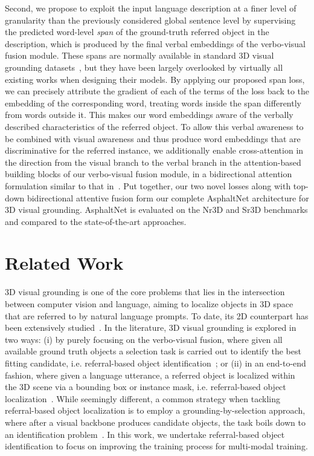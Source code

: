 \documentclass[10pt,twocolumn,letterpaper]{article}
\begin{document}
Second, we propose to exploit the input language description at a finer level of granularity than the previously considered global sentence level by supervising the predicted word-level \emph{span} of the ground-truth referred object in the description, which is produced by the final verbal embeddings of the verbo-visual fusion module. These spans are normally available in standard 3D visual grounding datasets~\cite{achlioptas2020referit_3d}, but they have been largely overlooked by virtually all existing works when designing their models. By applying our proposed span loss, we can precisely attribute the gradient of each of the terms of the loss back to the embedding of the corresponding word, treating words inside the span differently from words outside it. This makes our word embeddings aware of the verbally described characteristics of the referred object. To allow this verbal awareness to be combined with visual awareness and thus produce word embeddings that are discriminative for the referred instance, we additionally enable cross-attention in the direction from the visual branch to the verbal branch in the attention-based building blocks of our verbo-visual fusion module, in a bidirectional attention formulation similar to that in~\cite{jain2022bottom}. Put together, our two novel losses along with top-down bidirectional attentive fusion form our complete AsphaltNet architecture for 3D visual grounding. AsphaltNet is evaluated on the Nr3D and Sr3D benchmarks and compared to the state-of-the-art approaches.



\section{Related Work}
\label{sec:related_work}
\par{3D visual grounding} is one of the core problems that lies in the intersection between computer vision and language, aiming to localize objects in 3D space that are referred to by natural language prompts. To date, its 2D counterpart has been extensively studied~\cite{hu2016natural,2d1,mao2016generation, plummer2015flickr30k}. In the literature, 3D visual grounding is explored in two ways: (i) by purely focusing on the verbo-visual fusion, where given all available ground truth objects a selection task is carried out to identify the best fitting candidate, i.e. referral-based object identification~\cite{achlioptas2020referit_3d}; or (ii) in an end-to-end fashion, where given a language utterance, a referred object is localized within the 3D scene via a bounding box or instance mask, i.e. referral-based object localization~\cite{chen2020scanrefer}. While seemingly different, a common strategy when tackling referral-based object localization is to employ a grounding-by-selection approach, where after a visual backbone produces candidate objects, the task boils down to an identification problem~\cite{chen2020scanrefer, zhao2021_3DVG_Transformer, unal2023ways}. In this work, we undertake referral-based object identification to focus on improving the training process for multi-modal training.
\end{document}
